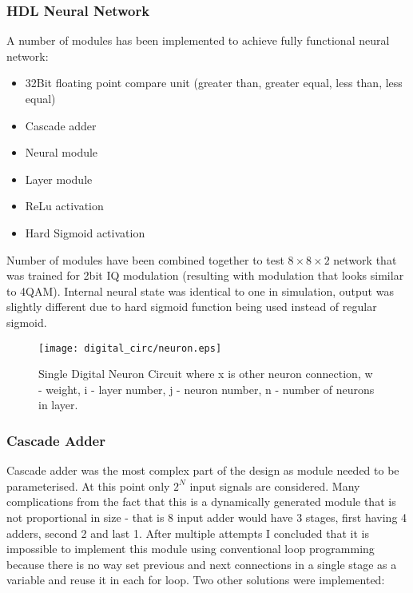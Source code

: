 
\subsubsection{HDL Neural Network}

A number of modules has been implemented to achieve fully functional neural network:
\begin{itemize}
    \item 32Bit floating point compare unit (greater than, greater equal, less than, less equal)
    \item Cascade adder
    \item Neural module
    \item Layer module
    \item ReLu activation
    \item Hard Sigmoid activation
\end{itemize}

Number of modules have been combined together to test $8 \times 8 \times 2$ network that was trained for 2bit IQ modulation (resulting with modulation that looks similar to 4QAM). Internal neural state was identical to one in simulation, output was slightly different due to hard sigmoid function being used instead of regular sigmoid.


\begin{figure}[H]
    \centering
    \texttt{[image: digital\_circ/neuron.eps]}
    \caption{Single Digital Neuron Circuit where x is other neuron connection, w - weight, i - layer number, j - neuron number, n - number of neurons in layer.}
    \label{fig:neuron_circ}
\end{figure}

\subsubsection{Cascade Adder}
Cascade adder was the most complex part of the design as module needed to be parameterised. At this point only $2^N$ input signals are considered. Many complications from the fact that this is a dynamically generated module that is not proportional in size - that is 8 input adder would have 3 stages, first having 4 adders, second 2 and last 1. After multiple attempts I concluded that it is impossible to implement this module using conventional loop programming because there is no way set previous and next connections in a single stage as a variable and reuse it in each for loop. Two other solutions were implemented:

